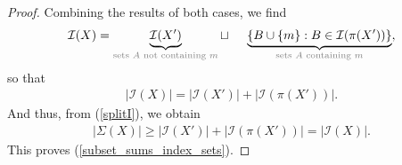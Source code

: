 \documentclass[10pt,a4paper]{amsart}
\newcommand{\abs}[1]{\left| #1 \right|}
\newcommand{\set}[1]{\left\{ #1 \right\}}
\begin{document}
\begin{proof}
Combining the results of both cases, we find
\begin{align*}
    \mathcal{I}(X) = \underbrace{\mathcal{I}(X')}_{\textcolor{gray}{\text{sets $A$ not containing $m$}}} \sqcup\ \ \ \ \underbrace{\set{B \cup \{m\} : B \in \mathcal{I}(\pi(X'))}}_{\textcolor{gray}{\text{sets $A$ containing $m$}}},
\end{align*} so that
\begin{align*}
    \abs{\mathcal{I}(X)} = \abs{\mathcal{I}(X')} + \abs{\mathcal{I}(\pi(X'))}.
\end{align*} And thus, from (\ref{splitI}), we obtain \begin{align*}
    \abs{\Sigma(X)} \geq \abs{\mathcal{I}(X')} + \abs{\mathcal{I}(\pi(X'))} = \abs{\mathcal{I}(X)}.
\end{align*} This proves (\ref{subset_sums_index_sets}).
\end{proof}
\end{document}
